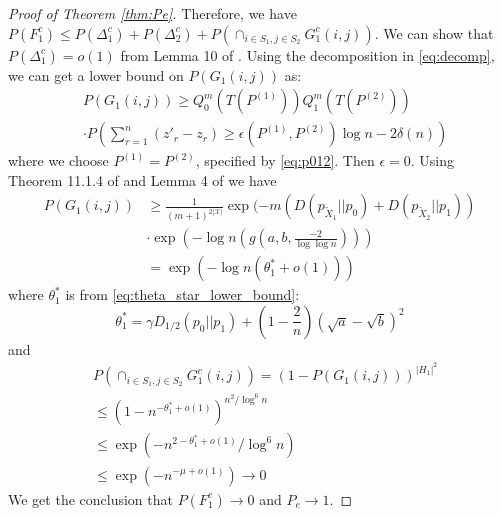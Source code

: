 \documentclass[conference]{IEEEtran}
\begin{document}
\begin{proof}[Proof of Theorem \ref{thm:Pe}]
Therefore, we have $P(F_1^c) \leq P(\Delta_1^c) + P(\Delta_2^c) + P(\cap_{i\in S_1, j\in S_2}G^c_1(i,j))$.
We can show that $P(\Delta_1^c) = o(1)$ from Lemma 10 of \cite{abbe2015exact}.
Using the decomposition in \eqref{eq:decomp}, we can get a lower bound on $P(G_1(i,j))$ as:
\begin{align*}
&P(G_1(i,j))  \geq Q^m_0 (T(P^{(1)}))  Q^m_1 (T(P^{(2)})) \\
&\cdot P(\sum_{r=1}^{n} (z'_r - z_r) \geq \epsilon(P^{(1)}, P^{(2)}) \log n- 2\delta(n) ) 
\end{align*}
where we choose $P^{(1)}=P^{(2)}$, specified by \eqref{eq:p012}. Then $\epsilon= 0$.
Using Theorem 11.1.4 of \cite{cover1999elements} and Lemma 4 of \cite{abbe2015exact} we have
\begin{align*}
P(G_1(i,j))& \geq \frac{1}{(m+1)^{2|\mathcal{X}|}} \exp(-m(D(p_{\widetilde{X}_1} || p_0) + D(p_{\widetilde{X}_2} || p_1)) \\
&\cdot\exp(- \log n (g(a, b, \frac{-2}{\log \log n}))) \\
& = \exp(-\log n (\theta_1^*+ o(1)))
\end{align*}
where $\theta_1^*$
is from \eqref{eq:theta_star_lower_bound}:
\begin{equation*}
\theta_1^* = \gamma D_{1/2}(p_0||p_1) + (1-\frac{2}{n})(\sqrt{a} - \sqrt{b})^2
\end{equation*}
and 
\begin{align*}
& P(\cap_{i\in S_1, j\in S_2} G^c_1(i,j)) = (1 - P(G_1(i,j)))^{|H_1|^2} \\
& \leq (1-n^{-\theta_1^*+o(1)})^{n^2/\log^6 n} \\
& \leq \exp(-n^{2 -\theta_1^* + o(1)}/\log^6 n) \\
& \leq \exp(-n^{-\mu+ o(1)}) \to 0
\end{align*}
We get the conclusion that $P(F_1^c) \to 0$ and $P_e \to 1$.

\end{proof}
\end{document}
